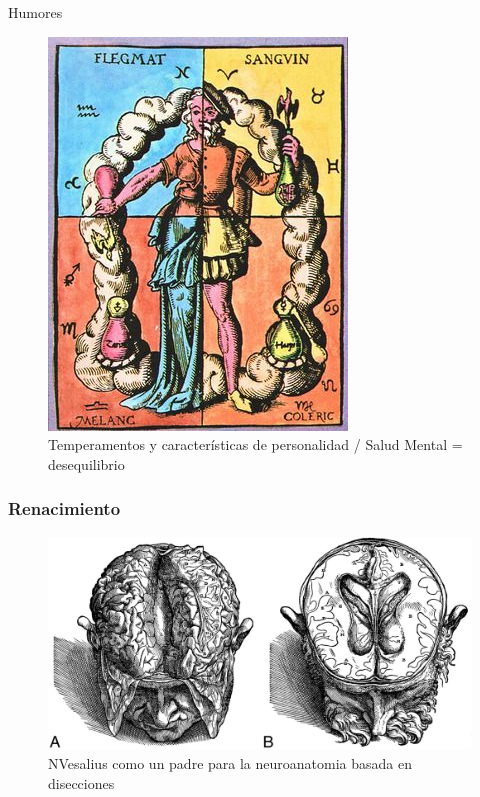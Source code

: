 \documentclass{beamer}
\begin{document}
\begin{frame}{Humores }
\transfade
\begin{figure}
    \centering
    \includegraphics[height=0.75\paperheight]{humores.jpg}
    \caption{Temperamentos y características de personalidad / Salud Mental = desequilibrio}
    \label{fig:my_label}
\end{figure}
\centering
    
\end{frame}


\begin{frame}
	\transfade
	\frametitle{Renacimiento}
	\begin{figure}
\centering
\includegraphics[width=1.1\linewidth]{vesalius1.jpg}
\caption{NVesalius como un padre para la neuroanatomia basada en disecciones}
\label{fig:ventriculos}
\end{figure}
\end{frame}
\end{document}

